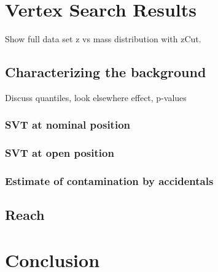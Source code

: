 \documentclass[12pt]{report}
\begin{document}
\chapter{Vertex Search Results} 
Show full data set z vs mass distribution with zCut. 


\section{Characterizing the background}
Discuss quantiles, look elsewhere effect, p-values


\subsection{SVT at nominal position}
\subsection{SVT at open position}
\subsection{Estimate of contamination by accidentals}

\section{Reach}




\chapter{Conclusion}



{}

  
\end{document}
